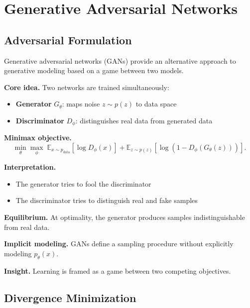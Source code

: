 \chapter{Generative Adversarial Networks}

\section{Adversarial Formulation}

Generative adversarial networks (GANs) provide an alternative approach to generative modeling based on a game between two models.

\medskip

\noindent
\textbf{Core idea.}  
Two networks are trained simultaneously:
\begin{itemize}
    \item \textbf{Generator} $G_\theta$: maps noise $z \sim p(z)$ to data space
    \item \textbf{Discriminator} $D_\phi$: distinguishes real data from generated data
\end{itemize}

\medskip

\noindent
\textbf{Minimax objective.}
\[
\min_\theta \max_\phi \;
\mathbb{E}_{x \sim p_{\text{data}}}[\log D_\phi(x)]
+
\mathbb{E}_{z \sim p(z)}[\log(1 - D_\phi(G_\theta(z)))].
\]

\medskip

\noindent
\textbf{Interpretation.}
\begin{itemize}
    \item The generator tries to fool the discriminator
    \item The discriminator tries to distinguish real and fake samples
\end{itemize}

\medskip

\noindent
\textbf{Equilibrium.}  
At optimality, the generator produces samples indistinguishable from real data.

\medskip

\noindent
\textbf{Implicit modeling.}  
GANs define a sampling procedure without explicitly modeling $p_\theta(x)$.

\medskip

\noindent
\textbf{Insight.}  
Learning is framed as a game between two competing objectives.

\section{Divergence Minimization}

